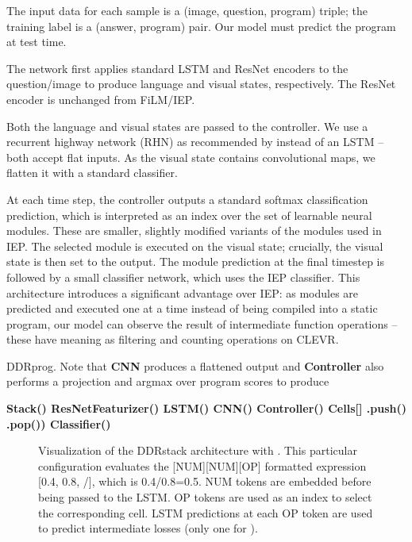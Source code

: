\documentclass{article}
\begin{document}
The input data  for each sample is a (image, question, program) triple; the training label  is a (answer, program) pair. Our model must predict the program at test time.

The network first applies standard LSTM and ResNet \cite{DBLP:journals/corr/HeZRS15} encoders to the question/image to produce language and visual states, respectively. The ResNet encoder is unchanged from FiLM/IEP.

Both the language and visual states are passed to the controller. We use a recurrent highway network (RHN) \cite{DBLP:journals/corr/ZillySKS16} as recommended by \cite{NIPS2017_6919} instead of an LSTM \cite{Hochreiter:1997:LSM:1246443.1246450} -- both accept flat inputs. As the visual state contains convolutional maps, we flatten it with a standard classifier.

At each time step, the controller outputs a standard softmax classification prediction, which is interpreted as an index over the set of learnable neural modules. These are smaller, slightly modified variants of the modules used in IEP. The selected module is executed on the visual state; crucially, the visual state is then set to the output. The module prediction at the final timestep is followed by a small classifier network, which uses the IEP classifier. This architecture introduces a significant advantage over IEP: as modules are predicted and executed one at a time instead of being compiled into a static program, our model can observe the result of intermediate function operations -- these have meaning as filtering and counting operations on CLEVR. 
\begin{algorithm}[H]
\caption{DDRprog. Note that \textbf{CNN} produces a flattened output and \textbf{Controller} also performs a projection and argmax over program scores to produce }
\begin{algorithmic}
\INPUT 
\STATE  \bf{Stack}()
\STATE  \bf{ResNetFeaturizer}()
\STATE  \bf{LSTM}()
\FOR{}
	\STATE  CNN()
	\STATE  Controller()
    \STATE  \bf{Cells}[]
    	\STATE .push()
        \STATE .pop())
    \ELSE{}
    	\STATE 
    \ENDIF
\ENDFOR{}
\OUTPUT \bf{Classifier}()
\end{algorithmic}
\end{algorithm}
\vspace{-5mm}

\begin{figure*}
  \centering
  \vspace{-3.mm}
  \caption{Visualization of the DDRstack architecture with . This particular configuration evaluates the [NUM][NUM][OP] formatted expression [0.4, 0.8, /], which is 0.4/0.8=0.5. NUM tokens are embedded before being passed to the LSTM. OP tokens are used as an index to select the corresponding cell. LSTM predictions at each OP token are used to predict intermediate losses (only one for ).}
  \vspace{-2.mm}
\end{figure*}
\end{document}

